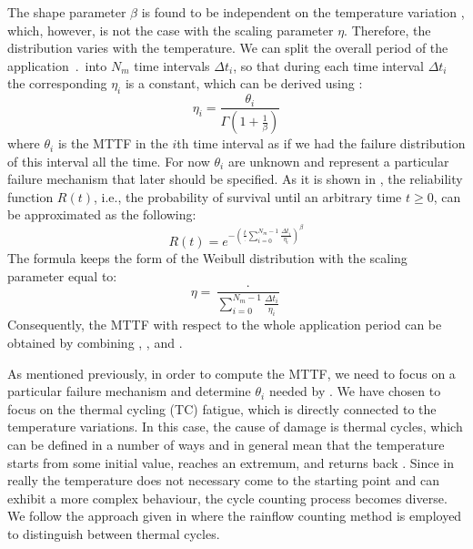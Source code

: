 The shape parameter $\beta$ is found to be independent on the temperature variation \cite{chang2006}, which, however, is not the case with the scaling parameter $\eta$. Therefore, the distribution varies with the temperature. We can split the overall period of the application $\period$ into $N_m$ time intervals $\Delta t_i$, so that during each time interval $\Delta t_i$ the corresponding $\eta_i$ is a constant, which can be derived using :
\begin{equation} \label{eq:eta-one}
  \eta_i = \frac{\theta_i}{\Gamma(1 + \frac{1}{\beta})}
\end{equation}
where $\theta_i$ is the MTTF in the $i$th time interval as if we had the failure distribution of this interval all the time. For now $\theta_i$ are unknown and represent a particular failure mechanism that later should be specified. As it is shown in \cite{xiang2010}, the reliability function $R(t)$, i.e., the probability of survival until an arbitrary time $t \geq 0$, can be approximated as the following:
\[
  R(t) = e^{-(\frac{t}{\period} \sum_{i=0}^{N_m - 1} \frac{\Delta t_i}{\eta_i})^\beta}
\]
The formula keeps the form of the Weibull distribution with the scaling parameter equal to:
\begin{equation} \label{eq:eta-many}
  \eta = \frac{\period}{\sum_{i=0}^{N_m - 1} \frac{\Delta t_i}{\eta_i}}
\end{equation}
Consequently, the MTTF with respect to the whole application period can be obtained by combining , , and .

As mentioned previously, in order to compute the MTTF, we need to focus on a particular failure mechanism and determine $\theta_i$ needed by . We have chosen to focus on the thermal cycling (TC) fatigue, which is directly connected to the temperature variations. In this case, the cause of damage is thermal cycles, which can be defined in a number of ways \cite{ciappa2003} and in general mean that the temperature starts from some initial value, reaches an extremum, and returns back \cite{xiang2010}. Since in really the temperature does not necessary come to the starting point and can exhibit a more complex behaviour, the cycle counting process becomes diverse. We follow the approach given in \cite{xiang2010} where the rainflow counting method is employed to distinguish between thermal cycles.

